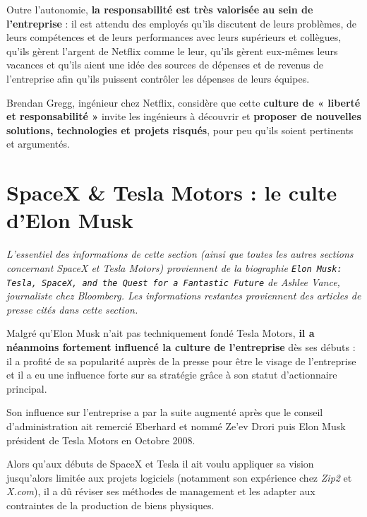 \vspace{5mm}

Outre l'autonomie, \textbf{la responsabilité est très valorisée au sein de l'entreprise} : il est attendu des employés qu'ils discutent de leurs problèmes, de leurs compétences et de leurs performances avec leurs supérieurs et collègues, qu'ils gèrent l'argent de Netflix comme le leur, qu'ils gèrent eux-mêmes leurs vacances et qu'ils aient une idée des sources de dépenses et de revenus de l’entreprise afin qu’ils puissent contrôler les dépenses de leurs équipes. 

Brendan Gregg\supercite{WorkingAtNetflix}, ingénieur chez Netflix, considère que cette \textbf{culture de « liberté et responsabilité »} invite les ingénieurs à découvrir et \textbf{proposer de nouvelles solutions, technologies et projets risqués}, pour peu qu'ils soient pertinents et argumentés. 

\section{SpaceX \& Tesla Motors : le culte d'Elon Musk}

\textit{L'essentiel des informations de cette section (ainsi que toutes les autres sections concernant SpaceX et Tesla Motors) proviennent de la biographie \texttt{Elon Musk: Tesla, SpaceX, and the Quest for a Fantastic Future}\supercite{ElonMuskBiography} de Ashlee Vance, journaliste chez Bloomberg. Les informations restantes proviennent des articles de presse cités dans cette section.} 

\vspace{5mm}

Malgré qu'Elon Musk n'ait pas techniquement fondé Tesla Motors, \textbf{il a néanmoins fortement influencé la culture de l'entreprise} dès ses débuts : il a profité de sa popularité auprès de la presse pour être le visage de l'entreprise et il a eu une influence forte sur sa stratégie grâce à son statut d'actionnaire principal.

Son influence sur l'entreprise a par la suite augmenté après que le conseil d'administration ait remercié Eberhard et nommé Ze'ev Drori puis Elon Musk président de Tesla Motors en Octobre 2008\supercite{MuskTeslaCEO}.

Alors qu'aux débuts de SpaceX et Tesla il ait voulu appliquer sa vision jusqu'alors limitée aux projets logiciels (notamment son expérience chez \textit{Zip2} et \textit{X.com}), il a dû réviser ses méthodes de management et les adapter aux contraintes de la production de biens physiques.

